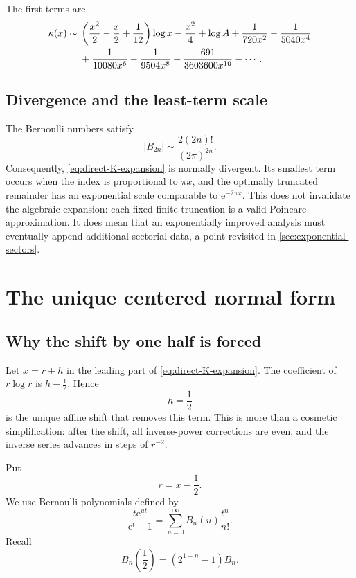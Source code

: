 \documentclass[11pt,a4paper]{article}
\numberwithin{equation}{section}
\theoremstyle{remark}
\newcommand{\e}{\mathrm e}
\begin{document}
The first terms are
\begin{align}
\kappa(x)\sim{}&
\left(\frac{x^2}{2}-\frac{x}{2}+\frac1{12}\right)\log x
-\frac{x^2}{4}+\log A
+\frac{1}{720x^2}-\frac{1}{5040x^4}
\notag\\
&+\frac{1}{10080x^6}-\frac{1}{9504x^8}
+\frac{691}{3603600x^{10}}-\cdots.
\label{eq:direct-first-terms}
\end{align}

\subsection{Divergence and the least-term scale}

The Bernoulli numbers satisfy
\[
|B_{2n}|\sim \frac{2(2n)!}{(2\pi)^{2n}}.
\]
Consequently, \cref{eq:direct-K-expansion} is normally divergent.  Its
smallest term occurs when the index is proportional to \(\pi x\), and the
optimally truncated remainder has an exponential scale comparable to
\(\e^{-2\pi x}\).  This does not invalidate the algebraic expansion: each
fixed finite truncation is a valid Poincare approximation.  It does mean that
an exponentially improved analysis must eventually append additional
sectorial data, a point revisited in \cref{sec:exponential-sectors}.

\section{The unique centered normal form}
\label{sec:centered}

\subsection{Why the shift by one half is forced}

Let \(x=r+h\) in the leading part of \cref{eq:direct-K-expansion}.  The
coefficient of \(r\log r\) is \(h-\tfrac12\).  Hence
\[
h=\frac12
\]
is the unique affine shift that removes this term.  This is more than a
cosmetic simplification: after the shift, all inverse-power corrections are
even, and the inverse series advances in steps of \(r^{-2}\).

Put
\begin{equation}
r=x-\frac12.
\label{eq:r-definition}
\end{equation}
We use Bernoulli polynomials defined by
\[
\frac{t\e^{ut}}{\e^t-1}
=\sum_{n=0}^{\infty}B_n(u)\frac{t^n}{n!}.
\]
Recall
\[
B_n\!\left(\frac12\right)=\left(2^{1-n}-1\right)B_n.
\]
\end{document}
